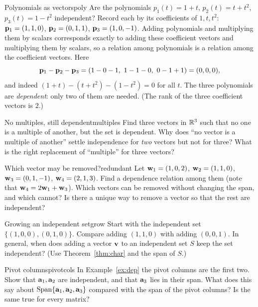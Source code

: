 \documentclass[11pt]{article}
\begin{document}
\begin{exmp}{Polynomials as vectors}{poly}
Are the polynomials $p_1(t)=1+t$, $p_2(t)=t+t^2$, $p_3(t)=1-t^2$ independent? Record each by its coefficients of $1,t,t^2$: $\mathbf{p}_1=(1,1,0)$, $\mathbf{p}_2=(0,1,1)$, $\mathbf{p}_3=(1,0,-1)$. Adding polynomials and multiplying them by scalars corresponds exactly to adding these coefficient vectors and multiplying them by scalars, so a relation among polynomials is a relation among the coefficient vectors. Here
\[
\bv{p}_1-\bv{p}_2-\bv{p}_3=(1-0-1,\ 1-1-0,\ 0-1+1)=(0,0,0),
\]
and indeed $(1+t)-(t+t^2)-(1-t^2)=0$ for all $t$. The three polynomials are \emph{dependent}: only two of them are needed. (The rank of the three coefficient vectors is $2$.)
\end{exmp}

\begin{think}{No multiples, still dependent}{multiples}
Find three vectors in $\mathbb{R}^3$ such that no one is a multiple of another, but the set is dependent. Why does ``no vector is a multiple of another'' settle independence for \emph{two} vectors but not for three? What is the right replacement of ``multiple'' for three vectors?
\end{think}

\begin{think}{Which vector may be removed?}{redundant}
Let $\mathbf{w}_1=(1,0,2)$, $\mathbf{w}_2=(1,1,0)$, $\mathbf{w}_3=(0,1,-1)$, $\mathbf{w}_4=(2,1,3)$. Find a dependence relation among them (note that $\mathbf{w}_4=2\mathbf{w}_1+\mathbf{w}_3$). Which vectors can be removed without changing the span, and which cannot? Is there a unique way to remove a vector so that the rest are independent?
\end{think}

\begin{think}{Growing an independent set}{grow}
Start with the independent set $\{(1,0,0),(0,1,0)\}$. Compare adding $(1,1,0)$ with adding $(0,0,1)$. In general, when does adding a vector $\mathbf{v}$ to an independent set $S$ keep the set independent? (Use Theorem~\ref{thm:char} and the span of $S$.)
\end{think}

\begin{think}{Pivot columns}{pivotcols}
In Example~\ref{ex:dep} the pivot columns are the first two. Show that $\mathbf{a}_1,\mathbf{a}_2$ are independent, and that $\mathbf{a}_3$ lies in their span. What does this say about $\operatorname{Span}\{\mathbf{a}_1,\mathbf{a}_2,\mathbf{a}_3\}$ compared with the span of the pivot columns? Is the same true for every matrix?
\end{think}
\end{document}
